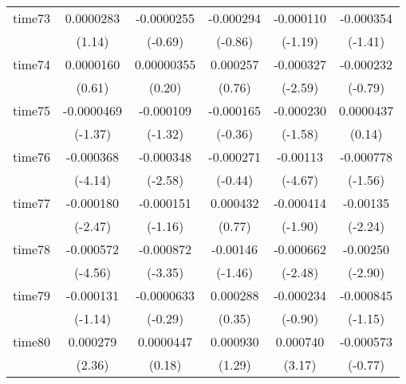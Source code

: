 \begin{table}[htbp]
\begin{tabular}{l*{5}{c}}
time73      &   0.0000283         &  -0.0000255         &   -0.000294         &   -0.000110         &   -0.000354         \\
            &      (1.14)         &     (-0.69)         &     (-0.86)         &     (-1.19)         &     (-1.41)         \\
time74      &   0.0000160         &  0.00000355         &    0.000257         &   -0.000327\sym{**} &   -0.000232         \\
            &      (0.61)         &      (0.20)         &      (0.76)         &     (-2.59)         &     (-0.79)         \\
time75      &  -0.0000469         &   -0.000109         &   -0.000165         &   -0.000230         &   0.0000437         \\
            &     (-1.37)         &     (-1.32)         &     (-0.36)         &     (-1.58)         &      (0.14)         \\
time76      &   -0.000368\sym{***}&   -0.000348\sym{**} &   -0.000271         &    -0.00113\sym{***}&   -0.000778         \\
            &     (-4.14)         &     (-2.58)         &     (-0.44)         &     (-4.67)         &     (-1.56)         \\
time77      &   -0.000180\sym{*}  &   -0.000151         &    0.000432         &   -0.000414         &    -0.00135\sym{*}  \\
            &     (-2.47)         &     (-1.16)         &      (0.77)         &     (-1.90)         &     (-2.24)         \\
time78      &   -0.000572\sym{***}&   -0.000872\sym{***}&    -0.00146         &   -0.000662\sym{*}  &    -0.00250\sym{**} \\
            &     (-4.56)         &     (-3.35)         &     (-1.46)         &     (-2.48)         &     (-2.90)         \\
time79      &   -0.000131         &  -0.0000633         &    0.000288         &   -0.000234         &   -0.000845         \\
            &     (-1.14)         &     (-0.29)         &      (0.35)         &     (-0.90)         &     (-1.15)         \\
time80      &    0.000279\sym{*}  &   0.0000447         &    0.000930         &    0.000740\sym{**} &   -0.000573         \\
            &      (2.36)         &      (0.18)         &      (1.29)         &      (3.17)         &     (-0.77)         \\

\end{tabular}
\end{table}

